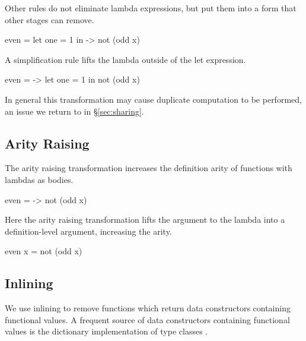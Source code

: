 \noindent Other rules do not eliminate lambda expressions, but put them into a form that other stages can remove.

\begin{example}
\begin{code}
even =  let  one = 1
        in   \x -> not (odd x)
\end{code}

\noindent A simplification rule lifts the lambda outside of the let expression.

\begin{code}
even = \x ->  let  one = 1
              in   not (odd x)
\end{code}

\noindent In general this transformation may cause duplicate computation to be performed, an issue we return to in \S\ref{sec:sharing}.
\end{example}


\subsection{Arity Raising}

The arity raising transformation increases the definition arity of functions with lambdas as bodies.

\begin{example}
\begin{code}
even = \x -> not (odd x)
\end{code}

\noindent Here the arity raising transformation lifts the argument to the lambda into a definition-level argument, increasing the arity.

\begin{code}
even x = not (odd x)
\end{code}
\end{example}


\subsection{Inlining}

We use inlining to remove functions which return data constructors containing functional values. A frequent source of data constructors containing functional values is the dictionary implementation of type classes \cite{wadler:type_classes}.

